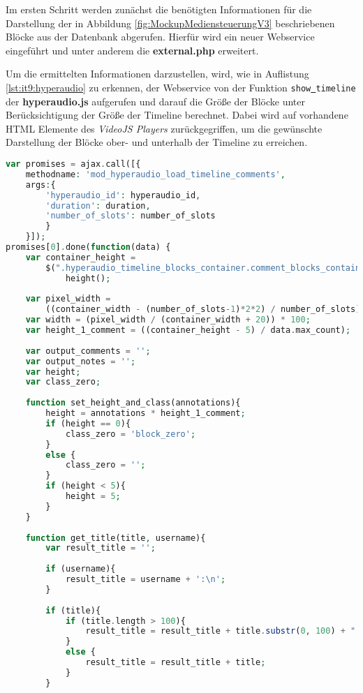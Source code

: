 Im ersten Schritt werden zunächst die benötigten Informationen für die Darstellung der in Abbildung \ref{fig:MockupMediensteuerungV3} beschriebenen Blöcke aus der Datenbank abgerufen. Hierfür wird ein neuer Webservice eingeführt und unter anderem  die \textbf{external.php} erweitert.

Um die ermittelten Informationen darzustellen, wird, wie in Auflistung \ref{lst:it9:hyperaudio} zu erkennen, der Webservice von der Funktion \texttt{show\underline{{ }}timeline} der \textbf{hyperaudio.js} aufgerufen und darauf die Größe der Blöcke unter Berücksichtigung der Größe der Timeline berechnet. Dabei wird auf vorhandene HTML Elemente des \textit{VideoJS Players} zurückgegriffen, um die gewünschte Darstellung der Blöcke ober- und unterhalb der Timeline zu erreichen.

\begin{lstlisting}[language=php,
             linewidth=\textwidth,
             caption={Ausschnitt der \textbf{hyperaudio.js} in der 9. Iteration},
             label={lst:it9:hyperaudio}]
var promises = ajax.call([{
    methodname: 'mod_hyperaudio_load_timeline_comments',
    args:{
        'hyperaudio_id': hyperaudio_id,
        'duration': duration,
        'number_of_slots': number_of_slots
        }
    }]);
promises[0].done(function(data) {
    var container_height =
        $(".hyperaudio_timeline_blocks_container.comment_blocks_container").
            height();
		    	
    var pixel_width = 
        ((container_width - (number_of_slots-1)*2*2) / number_of_slots);
    var width = (pixel_width / (container_width + 20)) * 100;
    var height_1_comment = ((container_height - 5) / data.max_count);
		    	
    var output_comments = '';
    var output_notes = '';
    var height;
    var class_zero;
		    	
    function set_height_and_class(annotations){
        height = annotations * height_1_comment;
        if (height == 0){
            class_zero = 'block_zero';
        }
        else {
            class_zero = '';
        }
        if (height < 5){
            height = 5;
        }
    }
		    	
    function get_title(title, username){
        var result_title = '';
		    		
        if (username){
            result_title = username + ':\n';
        }
		    		
        if (title){
            if (title.length > 100){
                result_title = result_title + title.substr(0, 100) + " ...";
            }
            else {
                result_title = result_title + title;
            }
        }
		    		

\end{lstlisting}
